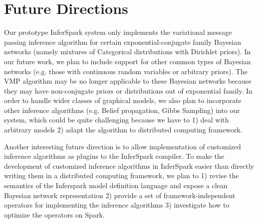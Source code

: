 \section{Future Directions}
\label{sec:future}

Our prototype InferSpark system only implements the variational message
passing inference algorithm for certain exponential-conjugate family Bayesian
networks (namely mixtures of Categorical distributions with Dirichlet priors).
In our future work, we plan to include support for other common types of
Bayesian networks (e.g. those with continuous random variables or arbitrary
priors). The VMP algorithm may be no longer applicable to these Bayesian
networks because they may have non-conjugate priors or distributions out of
exponential family. In order to handle wider classes of graphical models, we
also plan to incorporate other inference algorithms (e.g. Belief propagation,
Gibbs Sampling) into our system, which could be quite challenging because we
have to 1) deal with arbitrary models 2) adapt the algorithm to distributed
computing framework.

Another interesting future direction is to allow implementation of customized
inference algorithms as plugins to the InferSpark compiler. To make the
development of customized inference algorithms in InferSpark easier than
directly writing them in a distributed computing framework, we plan to 1)
revise the semantics of the Inferspark model definition language and expose a
clean Bayesian network representation 2) provide a set of framework-independent
operators for implementing the inference algorithms 3) investigate how to
optimize the operators on Spark.

